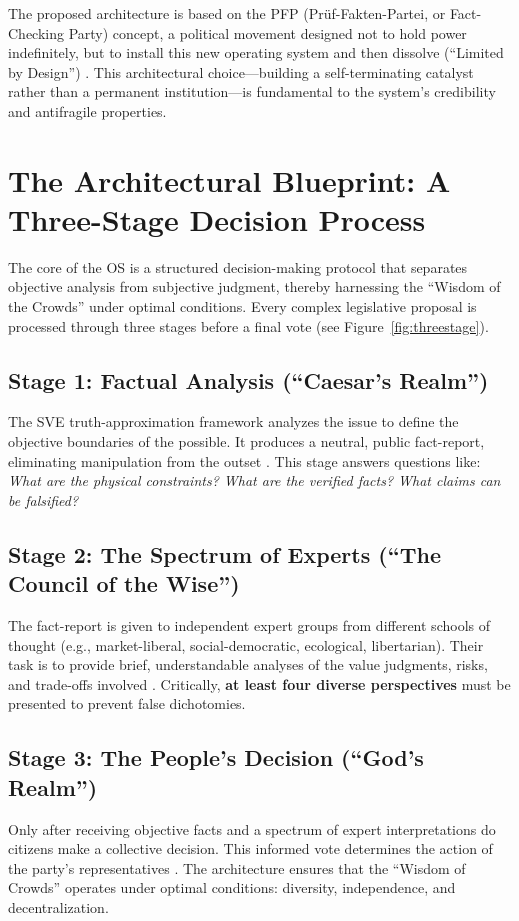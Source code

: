 \documentclass[11pt,a4paper]{article}
\begin{document}
\begin{small}
The proposed architecture is based on the PFP (Prüf-Fakten-Partei, or Fact-Checking Party) concept, a political movement designed not to hold power indefinitely, but to install this new operating system and then dissolve (``Limited by Design'') \citep{Kovnatsky2025PFP}. This architectural choice—building a self-terminating catalyst rather than a permanent institution—is fundamental to the system's credibility and antifragile properties.

\section{The Architectural Blueprint: A Three-Stage Decision Process}
The core of the OS is a structured decision-making protocol that separates objective analysis from subjective judgment, thereby harnessing the ``Wisdom of the Crowds'' \citep{Surowiecki2004} under optimal conditions. Every complex legislative proposal is processed through three stages before a final vote (see Figure~\ref{fig:threestage}).

\subsection{Stage 1: Factual Analysis (``Caesar's Realm'')}
The SVE truth-approximation framework analyzes the issue to define the objective boundaries of the possible. It produces a neutral, public fact-report, eliminating manipulation from the outset \citep[lines 3409--3411, 3488--3489]{AnalyticalReport2025}. This stage answers questions like: \textit{What are the physical constraints? What are the verified facts? What claims can be falsified?}

\subsection{Stage 2: The Spectrum of Experts (``The Council of the Wise'')}
The fact-report is given to independent expert groups from different schools of thought (e.g., market-liberal, social-democratic, ecological, libertarian). Their task is to provide brief, understandable analyses of the value judgments, risks, and trade-offs involved \citep[lines 3412--3414, 3488--3489]{AnalyticalReport2025}. Critically, \textbf{at least four diverse perspectives} must be presented to prevent false dichotomies.

\subsection{Stage 3: The People's Decision (``God's Realm'')}
Only after receiving objective facts and a spectrum of expert interpretations do citizens make a collective decision. This informed vote determines the action of the party's representatives \citep[lines 3415--3416, 3488--3489]{AnalyticalReport2025}. The architecture ensures that the ``Wisdom of Crowds'' operates under optimal conditions: diversity, independence, and decentralization.


\end{small}
\end{document}
